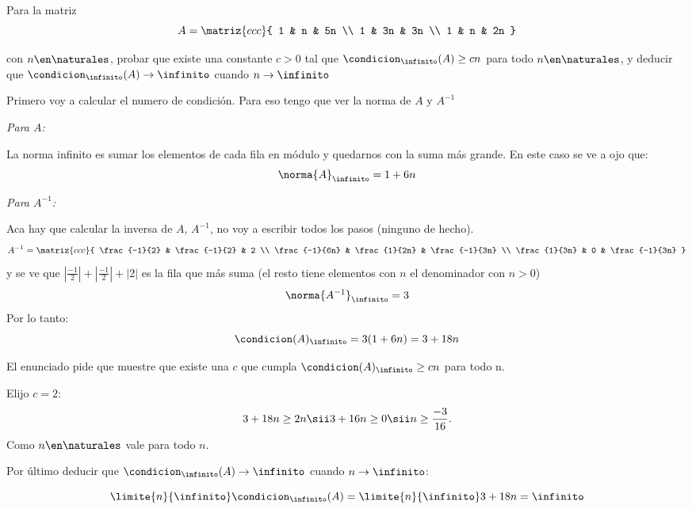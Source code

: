 \begin{enunciado}{\ejercicio}
  Para la matriz
  $$
    A =
    \matriz{ccc}{
      1 & n & 5n \\
      1 & 3n & 3n \\
      1 & n & 2n
    }$$

  con $n \en \naturales$, probar que existe una constante $c > 0$ tal que $\condicion_\infinito(A) \geq cn$ para todo $n \en \naturales$,
  y deducir que $\condicion_\infinito(A) \to \infinito$ cuando $n \to \infinito$
\end{enunciado}

\medskip

Primero voy a calcular el numero de condición. Para eso tengo que ver la norma de $A$ y $A^{-1}$

\textit{Para $A$:}

La norma infinito es sumar los elementos de cada fila en módulo y quedarnos con la suma más grande.
En este caso se ve a ojo que:
$$
  \norma{A}_\infinito = 1 + 6n
$$

\textit{Para $A^{-1}$:}

Aca hay que calcular la inversa de $A$, $A^{-1}$, no voy a escribir todos los pasos (ninguno de hecho).
$$
  A^{-1} =
  \matriz{ccc}{
    \frac{-1}{2} & \frac{-1}{2} & 2 \\
    \frac{-1}{6n} & \frac{1}{2n} & \frac{-1}{3n} \\
    \frac{1}{3n} & 0 & \frac{-1}{3n}
  }
$$
y se ve que $|\frac{-1}{2}| + |\frac{-1}{2}| + |2|$ es la fila que más suma
(el resto tiene elementos con $n$ el denominador con $n > 0$)
$$
  \norma{A^{-1}}_\infinito = 3
$$
Por lo tanto:
$$
  \condicion(A)_\infinito = 3(1 + 6n) = 3 + 18n
$$

El enunciado pide que muestre que existe una $c$ que cumpla $\condicion(A)_\infinito \geq cn$ para todo n.

Elijo $c = 2$:
$$
  3 + 18n \geq 2n \sii 3 + 16n \geq 0 \sii n \geq \frac{-3}{16}.
$$
Como $n \en \naturales$ vale para todo $n$.

Por último deducir que $\condicion_\infinito(A) \to \infinito$ cuando $n \to \infinito$:

$$
  \limite{n}{\infinito}\condicion_\infinito(A) = \limite{n}{\infinito} 3+18n = \infinito
$$

\begin{aportes}
  \item {}
\end{aportes}
